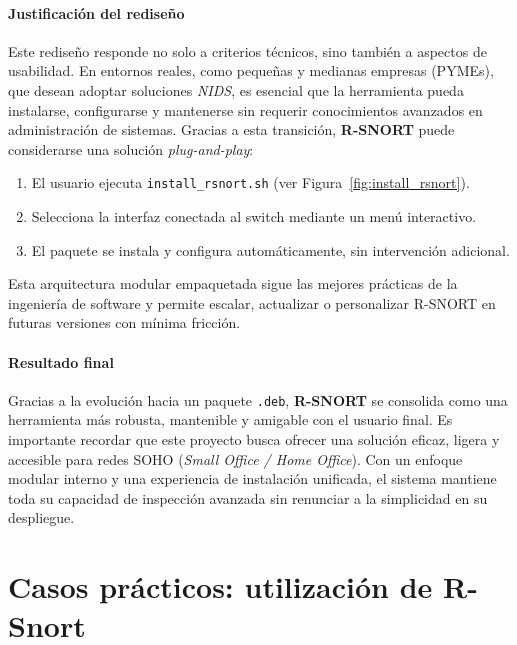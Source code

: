 \documentclass[11pt,a4paper,twoside]{report}
\begin{document}
\subsubsection{Justificación del rediseño}

Este rediseño responde no solo a criterios técnicos, sino también a aspectos de usabilidad. En entornos reales, como pequeñas y medianas empresas (PYMEs), que desean adoptar soluciones \textit{NIDS}, es esencial que la herramienta pueda instalarse, configurarse y mantenerse sin requerir conocimientos avanzados en administración de sistemas. Gracias a esta transición, \textbf{R-SNORT} puede considerarse una solución \textit{plug-and-play}:

\begin{enumerate}
	\item El usuario ejecuta \texttt{install\_rsnort.sh} (ver Figura~\ref{fig:install_rsnort}).
	\item Selecciona la interfaz conectada al switch mediante un menú interactivo.
	\item El paquete se instala y configura automáticamente, sin intervención adicional.
\end{enumerate}

Esta arquitectura modular empaquetada sigue las mejores prácticas de la ingeniería de software y permite escalar, actualizar o personalizar R-SNORT en futuras versiones con mínima fricción.

\pagebreak

\subsubsection{Resultado final}

Gracias a la evolución hacia un paquete \texttt{.deb}, \textbf{R-SNORT} se consolida como una herramienta más robusta, mantenible y amigable con el usuario final. Es importante recordar que este proyecto busca ofrecer una solución eficaz, ligera y accesible para redes SOHO (\textit{Small Office / Home Office}). Con un enfoque modular interno y una experiencia de instalación unificada, el sistema mantiene toda su capacidad de inspección avanzada sin renunciar a la simplicidad en su despliegue.



\chapter{Casos prácticos: utilización de R-Snort}
\end{document}
